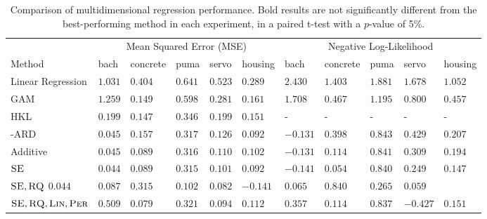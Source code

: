 \begin{table*}[ht!]
\caption{{\small
Comparison of multidimensional regression performance. Bold results are not significantly different from the best-performing method in each experiment, in a paired t-test with a $p$-value of 5\%.
}}
\label{tbl:Regression Mean Squared Error}
{\small
\begin{center}
\begin{tabularx}{\textwidth}{l | XXXXX | XXXXX}
 & \multicolumn{5}{c}{Mean Squared Error (MSE)} & \multicolumn{5}{c}{Negative Log-Likelihood} \\
 Method & bach  & concrete  & puma  &  servo & housing
& bach  & concrete  & puma  &  servo & housing
\\ \hline
Linear Regression 
& $1.031$ & $0.404$ & $0.641$ & $0.523$ & $0.289$ 
& $2.430$ & $1.403$ & $1.881$ & $1.678$ & $1.052$ \\
GAM 
& $1.259$ & $0.149$ & $0.598$ & $0.281$ & $0.161$ 
& $1.708$ & $0.467$ & $1.195$ & $0.800$ & $0.457$ \\
HKL 
& $\mathbf{0.199}$ & $0.147$ & $0.346$ & $0.199$ & $0.151$ 
& - & - & - & - & -\\
\gp{} \kSE{}-ARD 
& $\mathbf{0.045}$ & $0.157$ & $\mathbf{0.317}$ & $\mathbf{0.126}$ & $\mathbf{0.092}$
& $\mathbf{-0.131}$ & $0.398$ & $\mathbf{0.843}$ & $0.429$ & $0.207$ \\
\gp{} Additive 
& $\mathbf{0.045}$ & $\mathbf{0.089}$ & $\mathbf{0.316}$ & $\mathbf{0.110}$ & $0.102$
& $\mathbf{-0.131}$ & $\mathbf{0.114}$ & $\mathbf{0.841}$ & $0.309$ & $0.194$ \\
\hline
$\textsc{SE}{}$ 
& $\mathbf{0.044}$ & $0.089$ & $\mathbf{0.315}$ & $\mathbf{0.101}$ & $\mathbf{0.092}$ 
& $\mathbf{-0.141}$ & $\mathbf{0.054}$ & $\mathbf{0.840}$ & $0.249$ & $\mathbf{0.147}$ \\
$\textsc{SE}{}, \textsc{RQ}{}$
 $\mathbf{0.044}$ & $\mathbf{0.087}$ & $\mathbf{0.315}$ & $\mathbf{0.102}$ & $\mathbf{0.082}$
& $\mathbf{-0.141}$ & $\mathbf{0.065}$ & $\mathbf{0.840}$ & $0.265$ & $\mathbf{0.059}$ \\
$\textsc{SE}{}, \textsc{RQ}{}, \textsc{Lin}{}, \textsc{Per}{}$
& $\mathbf{0.509}$ & $\mathbf{0.079}$ & $\mathbf{0.321}$ & $\mathbf{0.094}$ & $\mathbf{0.112}$
& $\mathbf{0.357}$ & $\mathbf{0.114}$ & $\mathbf{0.837}$ & $\mathbf{-0.427}$ & $\mathbf{0.151}$ \\
\end{tabularx}
\end{center}
}
\end{table*}
